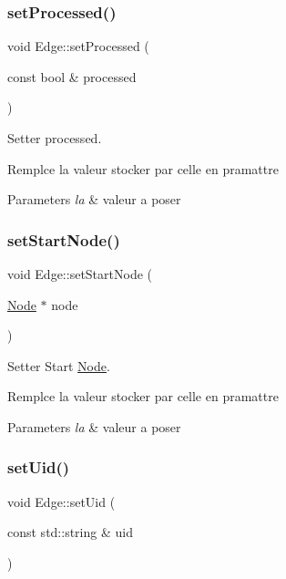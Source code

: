 \subsubsection{\texorpdfstring{set\+Processed()}{setProcessed()}}
{\footnotesize\ttfamily void Edge\+::set\+Processed (\begin{DoxyParamCaption}\item[{const bool \&}]{processed }\end{DoxyParamCaption})}



Setter processed. 

Remplce la valeur stocker par celle en pramattre


\begin{DoxyParams}{Parameters}
{\em la} & valeur a poser \\
\hline
\end{DoxyParams}
\mbox{\label{class_edge_a4a63f185bbe9f712381da62cdc3e33cc}} 
\subsubsection{\texorpdfstring{set\+Start\+Node()}{setStartNode()}}
{\footnotesize\ttfamily void Edge\+::set\+Start\+Node (\begin{DoxyParamCaption}\item[{\mbox{\hyperlink{class_node}{Node}} $\ast$}]{node }\end{DoxyParamCaption})}



Setter Start \mbox{\hyperlink{class_node}{Node}}. 

Remplce la valeur stocker par celle en pramattre


\begin{DoxyParams}{Parameters}
{\em la} & valeur a poser \\
\hline
\end{DoxyParams}
\mbox{\label{class_edge_a40842cb5908a28634da71ec1cabea963}} 
\subsubsection{\texorpdfstring{set\+Uid()}{setUid()}}
{\footnotesize\ttfamily void Edge\+::set\+Uid (\begin{DoxyParamCaption}\item[{const std\+::string \&}]{uid }\end{DoxyParamCaption})}



